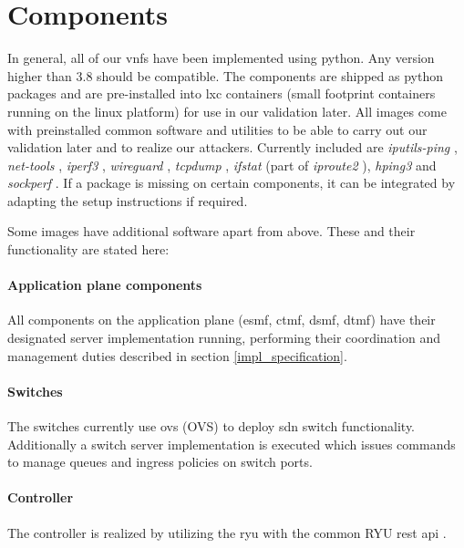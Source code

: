 \newpage


\section{Components}
In general, all of our \acrshort{vnf}s have been implemented using python. Any version higher than 3.8 should be compatible. The components are shipped as python packages and are pre-installed into \acrshort{lxc} containers (small footprint containers running on the linux platform) \cite{lxc} for use in our validation later. All images come with preinstalled common software and utilities to be able to carry out our validation later and to realize our attackers. Currently included are \textit{iputils-ping} \cite{iputils}, \textit{net-tools} \cite{net-tools}, \textit{iperf3} \cite{iperf3}, \textit{\gls{wireguard}} \cite{wireguard}, \textit{tcpdump} \cite{tcpdump}, \textit{ifstat} (part of \textit{iproute2} \cite{iproute2}), \textit{hping3} \cite{hping3} and \textit{sockperf} \cite{sockperf}. If a package is missing on certain components, it can be integrated by adapting the setup instructions if required.

Some images have additional software apart from above. These and their functionality are stated here:

\paragraph{Application plane components} All components on the application plane (\acrshort{esmf}, \acrshort{ctmf}, \acrshort{dsmf}, \acrshort{dtmf}) have their designated server implementation running, performing their coordination and management duties described in section \ref{impl_specification}.

\paragraph{Switches} The switches currently use \Gls{ovs} (OVS) \cite{openvswitch} to deploy \acrshort{sdn} switch functionality. Additionally a switch server implementation is executed which issues commands to manage queues and ingress policies on switch ports.

\paragraph{Controller} The controller is realized by utilizing the \Gls{ryu} \cite{ryu} with the common RYU \acrshort{rest} \acrshort{api} \cite{ryu-rest}.

